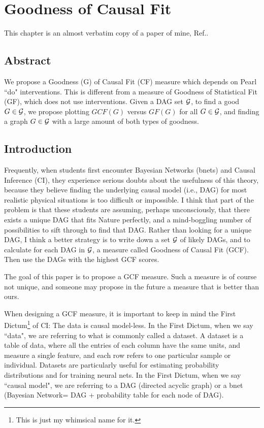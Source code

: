 \chapter{Goodness of Causal Fit}
\label{ch-good-causal-fit}
This chapter
is an almost verbatim 
copy of a paper of mine, Ref.\cite{tucci-gcf}.

\section{Abstract}
We propose a 
Goodness (G) of Causal Fit (CF) measure
which depends 
on Pearl ``do" interventions.
This is different
from a measure of Goodness of Statistical Fit (GF),
which does not use interventions.
Given a DAG set  ${\cal G}$,
to find a good $G\in {\cal G}$,
we propose plotting
$GCF(G)$ versus $GF(G)$
for all $G\in {\cal G}$,
and finding a 
graph $G\in {\cal G}$  with 
a large amount 
of both types of goodness.

\section{Introduction}



Frequently,
when students
first encounter
Bayesian Networks (bnets)
and Causal Inference (CI),
they experience serious doubts
about the usefulness of this
theory, because they believe
finding the underlying causal model
(i.e., DAG)
for most realistic
 physical situations is
too difficult or impossible.
I think
that part of the problem
is that these students
are assuming, perhaps
unconsciously,
that there exists
a unique DAG
that fits Nature perfectly,
and a mind-boggling number
 of possibilities
to sift through to find that DAG.
Rather than looking
for a unique DAG,
I think a better strategy
is to write down
a set ${\cal G}$ 
of likely DAGs,
and to calculate for 
each DAG in ${\cal G}$,
 a measure called 
Goodness of Causal Fit (GCF).
Then use the DAGs with
the highest GCF scores.


The goal of this paper
is to propose a GCF measure.
Such a measure is of course
not unique,
and someone may propose 
in the future a measure that is better
than ours.

When designing a GCF measure,
it is important to keep
in mind the First Dictum\footnote{
This is just my whimsical name for it.} of CI: The data
 is causal model-less.
 In the First Dictum,
when we say ``data", we are referring to what is commonly
 called a dataset. A dataset is a table of data, where all
 the entries of each column have the same units, and 
measure a single feature, and each row refers to one
 particular sample or individual. Datasets are particularly 
useful for estimating probability distributions and for 
training neural nets. In the First Dictum, when we say
``causal model", we are
referring to a DAG (directed acyclic graph) or a bnet
 (Bayesian Network= DAG + probability table 
for each node of DAG).

